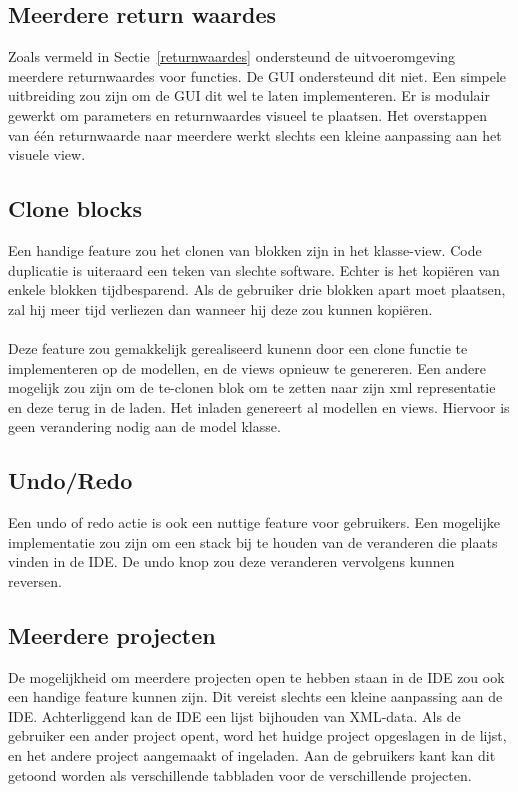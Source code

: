 \documentclass[]{article}
\begin{document}
\subsection{Meerdere return waardes}
Zoals vermeld in Sectie~\ref{returnwaardes} ondersteund de uitvoeromgeving meerdere returnwaardes voor functies. De GUI ondersteund dit niet. Een simpele uitbreiding zou zijn om de GUI dit wel te laten implementeren. Er is modulair gewerkt om parameters en returnwaardes visueel te plaatsen. Het overstappen van \'{e}\'{e}n returnwaarde naar meerdere werkt slechts een kleine aanpassing aan het visuele view.

\subsection{Clone blocks}
Een handige feature zou het clonen van blokken zijn in het klasse-view. Code duplicatie is uiteraard een teken van slechte software. Echter is het kopi\"eren van enkele blokken tijdbesparend. Als de gebruiker drie blokken apart moet plaatsen, zal hij meer tijd verliezen dan wanneer hij deze zou kunnen kopi\"eren. \\\\
Deze feature zou gemakkelijk gerealiseerd kunenn door een clone functie te implementeren op de modellen, en de views opnieuw te genereren. Een andere mogelijk zou zijn om de te-clonen blok om te zetten naar zijn xml representatie en deze terug in de laden. Het inladen genereert al modellen en views. Hiervoor is geen verandering nodig aan de model klasse. 

\subsection{Undo/Redo}
Een undo of redo actie is ook een nuttige feature voor gebruikers. Een mogelijke implementatie zou zijn om een stack bij te houden van de veranderen die plaats vinden in de IDE. De undo knop zou deze veranderen vervolgens kunnen reversen. 

\subsection{Meerdere projecten}
De mogelijkheid om meerdere projecten open te hebben staan in de IDE zou ook een handige feature kunnen zijn. Dit vereist slechts een kleine aanpassing aan de IDE. Achterliggend kan de IDE een lijst bijhouden van XML-data. Als de gebruiker een ander project opent, word het huidge project opgeslagen in de lijst, en het andere project aangemaakt of ingeladen. Aan de gebruikers kant kan dit getoond worden als verschillende tabbladen voor de verschillende projecten.
\end{document}

